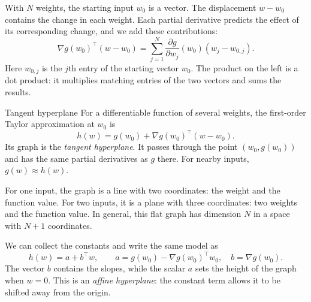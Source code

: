 \documentclass[a4paper,12pt,oneside]{report}
\begin{document}
With $N$ weights, the starting input $w_0$ is a vector.
The displacement $w-w_0$ contains the change in each weight.
Each partial derivative predicts the effect of its corresponding
change, and we add these contributions:
\[
  \nabla g(w_0)^\top(w-w_0)
  =\sum_{j=1}^{N}\frac{\partial g}{\partial w_j}(w_0)
    (w_j-w_{0,j}).
\]
Here $w_{0,j}$ is the $j$th entry of the starting vector $w_0$.
The product on the left is a dot product: it multiplies matching
entries of the two vectors and sums the results.

\begin{frameddefn}{Tangent hyperplane}\label{def:tangent-hyperplane}
For a differentiable function of several weights, the first-order
Taylor approximation at $w_0$ is
\[
  h(w)=g(w_0)+\nabla g(w_0)^\top(w-w_0).
\]
Its graph is the \emph{tangent hyperplane}. It passes through the
point $(w_0,g(w_0))$ and has the same partial derivatives as $g$
there. For nearby inputs, $g(w)\approx h(w)$.
\end{frameddefn}

For one input, the graph is a line with two coordinates: the weight
and the function value. For two inputs, it is a plane with three
coordinates: two weights and the function value. In general, this
flat graph has dimension $N$ in a space with $N+1$ coordinates.

We can collect the constants and write the same model as
\[
  h(w)=a+b^\top w,\qquad
  a=g(w_0)-\nabla g(w_0)^\top w_0,\quad b=\nabla g(w_0).
\]
The vector $b$ contains the slopes, while the scalar $a$ sets the
height of the graph when $w=0$. This is an \emph{affine hyperplane}:
the constant term allows it to be shifted away from the origin.
\end{document}
